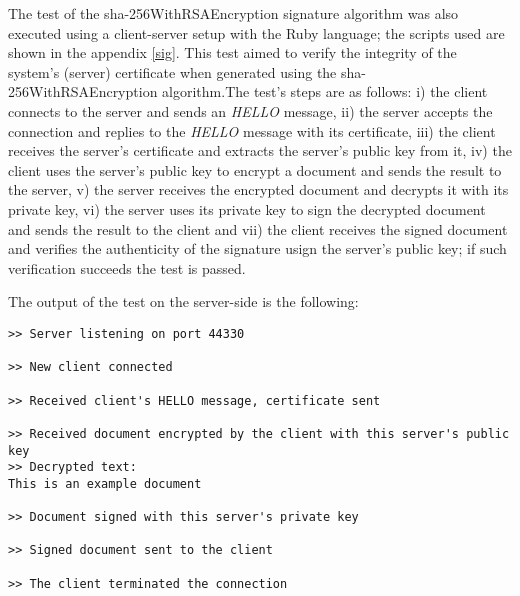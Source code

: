 The test of the sha-256WithRSAEncryption signature algorithm was also executed using a client-server setup with the Ruby language; the scripts used are shown in the appendix \ref{sig}. This test aimed to verify the integrity of the system's (server) certificate when generated using the sha-256WithRSAEncryption algorithm.The test's steps are as follows: i) the client connects to the server and sends an \textit{HELLO} message, ii) the server accepts the connection and replies to the \textit{HELLO} message with its certificate, iii) the client receives the server's certificate and extracts the server's public key from it, iv) the client uses the server's public key to encrypt a document and sends the result to the server, v) the server receives the encrypted document and decrypts it with its private key, vi) the server uses its private key to sign the decrypted document and sends the result to the client and vii) the client receives the signed document and verifies the authenticity of the signature usign the server's public key; if such verification succeeds the test is passed.

The output of the test on the server-side is the following:
\begin{verbatim}
>> Server listening on port 44330

>> New client connected

>> Received client's HELLO message, certificate sent

>> Received document encrypted by the client with this server's public key
>> Decrypted text:
This is an example document

>> Document signed with this server's private key

>> Signed document sent to the client

>> The client terminated the connection
\end{verbatim}

